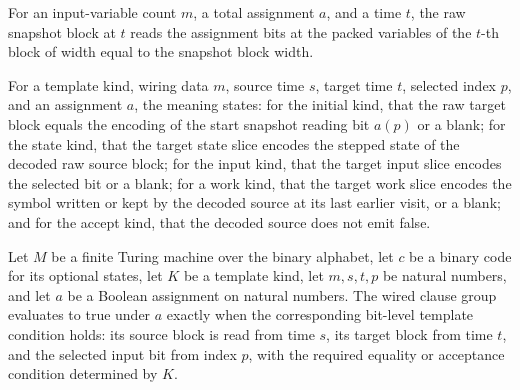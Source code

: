 \begin{definition}
\label{Complexity.clA5Block}
\leanok
{}
For an input-variable count $m$, a total assignment $a$, and a time $t$, the raw snapshot block at $t$ reads the assignment bits at the packed variables of the $t$-th block of width equal to the snapshot block width.
\end{definition}

\begin{definition}
\label{Complexity.clA5Meaning}
\leanok
{}
For a template kind, wiring data $m$, source time $s$, target time $t$, selected index $p$, and an assignment $a$, the meaning states: for the initial kind, that the raw target block equals the encoding of the start snapshot reading bit $a(p)$ or a blank; for the state kind, that the target state slice encodes the stepped state of the decoded raw source block; for the input kind, that the target input slice encodes the selected bit or a blank; for a work kind, that the target work slice encodes the symbol written or kept by the decoded source at its last earlier visit, or a blank; and for the accept kind, that the decoded source does not emit false.
\end{definition}

\begin{lemma}
\label{Complexity.clA5Group_eval}
\leanok
{}
Let $M$ be a finite Turing machine over the binary alphabet, let $c$ be a binary code
for its optional states, let $K$ be a template kind, let $m,s,t,p$ be natural numbers,
and let $a$ be a Boolean assignment on natural numbers. The wired clause group evaluates
to true under $a$ exactly when the corresponding bit-level template condition holds: its
source block is read from time $s$, its target block from time $t$, and the selected
input bit from index $p$, with the required equality or acceptance condition determined
by $K$.
\end{lemma}

